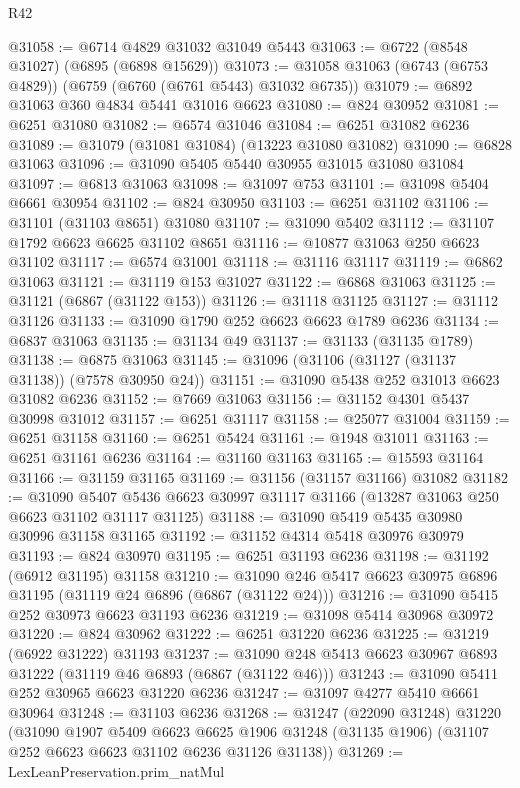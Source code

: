 \begin{lexlean}{R42}
\begin{coremodule}
{@31058 := @6714 @4829 @31032 @31049 @5443
@31063 := @6722 (@8548 @31027) (@6895 (@6898 @15629))
@31073 := @31058 @31063 (@6743 (@6753 @4829)) (@6759 (@6760 (@6761 @5443) @31032 @6735))
@31079 := @6892 @31063 @360 @4834 @5441 @31016 @6623
@31080 := @824 @30952
@31081 := @6251 @31080
@31082 := @6574 @31046
@31084 := @6251 @31082 @6236
@31089 := @31079 (@31081 @31084) (@13223 @31080 @31082)
@31090 := @6828 @31063
@31096 := @31090 @5405 @5440 @30955 @31015 @31080 @31084
@31097 := @6813 @31063
@31098 := @31097 @753
@31101 := @31098 @5404 @6661 @30954
@31102 := @824 @30950
@31103 := @6251 @31102
@31106 := @31101 (@31103 @8651) @31080
@31107 := @31090 @5402
@31112 := @31107 @1792 @6623 @6625 @31102 @8651
@31116 := @10877 @31063 @250 @6623 @31102
@31117 := @6574 @31001
@31118 := @31116 @31117
@31119 := @6862 @31063
@31121 := @31119 @153 @31027
@31122 := @6868 @31063
@31125 := @31121 (@6867 (@31122 @153))
@31126 := @31118 @31125
@31127 := @31112 @31126
@31133 := @31090 @1790 @252 @6623 @6623 @1789 @6236
@31134 := @6837 @31063
@31135 := @31134 @49
@31137 := @31133 (@31135 @1789)
@31138 := @6875 @31063
@31145 := @31096 (@31106 (@31127 (@31137 @31138)) (@7578 @30950 @24))
@31151 := @31090 @5438 @252 @31013 @6623 @31082 @6236
@31152 := @7669 @31063
@31156 := @31152 @4301 @5437 @30998 @31012
@31157 := @6251 @31117
@31158 := @25077 @31004
@31159 := @6251 @31158
@31160 := @6251 @5424
@31161 := @1948 @31011
@31163 := @6251 @31161 @6236
@31164 := @31160 @31163
@31165 := @15593 @31164
@31166 := @31159 @31165
@31169 := @31156 (@31157 @31166) @31082
@31182 := @31090
    @5407
    @5436
    @6623
    @30997
    @31117
    @31166
    (@13287 @31063 @250 @6623 @31102 @31117 @31125)
@31188 := @31090 @5419 @5435 @30980 @30996 @31158 @31165
@31192 := @31152 @4314 @5418 @30976 @30979
@31193 := @824 @30970
@31195 := @6251 @31193 @6236
@31198 := @31192 (@6912 @31195) @31158
@31210 := @31090 @246 @5417 @6623 @30975 @6896 @31195 (@31119 @24 @6896 (@6867 (@31122 @24)))
@31216 := @31090 @5415 @252 @30973 @6623 @31193 @6236
@31219 := @31098 @5414 @30968 @30972
@31220 := @824 @30962
@31222 := @6251 @31220 @6236
@31225 := @31219 (@6922 @31222) @31193
@31237 := @31090 @248 @5413 @6623 @30967 @6893 @31222 (@31119 @46 @6893 (@6867 (@31122 @46)))
@31243 := @31090 @5411 @252 @30965 @6623 @31220 @6236
@31247 := @31097 @4277 @5410 @6661 @30964
@31248 := @31103 @6236
@31268 := @31247
    (@22090 @31248)
    @31220
    (@31090
      @1907
      @5409
      @6623
      @6625
      @1906
      @31248
      (@31135 @1906)
      (@31107 @252 @6623 @6623 @31102 @6236 @31126 @31138))
@31269 := LexLeanPreservation.prim_natMul
}
\end{coremodule}
\end{lexlean}
